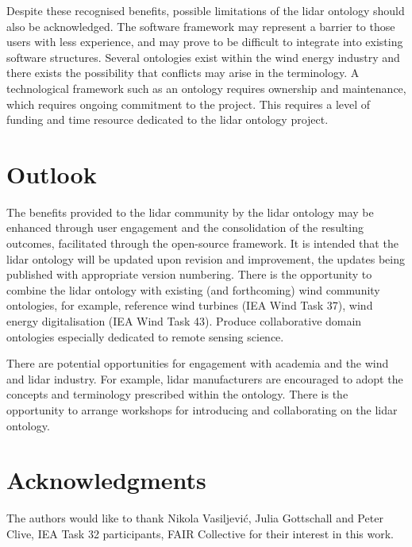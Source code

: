 \documentclass[remotesensing,article,submit,pdftex,moreauthors]{Definitions/mdpi}
\begin{document}
Despite these recognised benefits, possible limitations of the lidar ontology should also be acknowledged.
The software framework may represent a barrier to those users with less experience, and may prove to be difficult to integrate into existing software structures.
Several ontologies exist within the wind energy industry and there exists the possibility that conflicts may arise in the terminology.
A technological framework such as an ontology requires ownership and maintenance, which requires ongoing commitment to the project.
This requires a level of funding and time resource dedicated to the lidar ontology project. 



\section{Outlook}
\label{sec:Outlook}
The benefits provided to the lidar community by the lidar ontology may be enhanced through user engagement and the consolidation of the resulting outcomes, facilitated through the open-source framework.
It is intended that the lidar ontology will be updated upon revision and improvement, the updates being published with appropriate version numbering. There is the opportunity to combine the lidar ontology with existing (and forthcoming) wind community ontologies, for example,  
reference wind turbines (IEA Wind Task 37), wind energy digitalisation (IEA Wind Task 43). Produce collaborative domain ontologies especially dedicated to remote sensing science.

There are potential opportunities for engagement with academia and the wind and lidar industry. For example, lidar manufacturers are encouraged to adopt the concepts and terminology prescribed within the ontology.
There is the opportunity to arrange workshops for introducing and collaborating on the lidar ontology.


\section{Acknowledgments}
The authors would like to thank Nikola Vasiljevi\'{c}, Julia Gottschall and Peter Clive, IEA Task 32 participants, FAIR Collective for their interest in this work.
\end{document}
